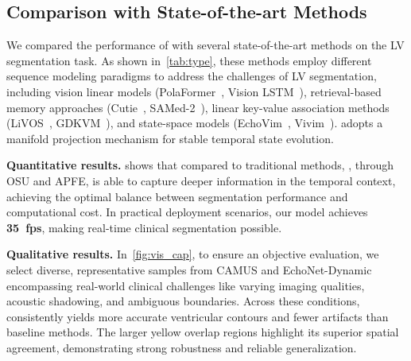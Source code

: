 \subsection{Comparison with State-of-the-art Methods}
    \label{subsec:comparisons}

\noindent
We compared the performance of \mymodel with several state-of-the-art methods on the LV segmentation task.
As shown in~\cref{tab:type}, these methods employ different sequence modeling paradigms to address the challenges of LV segmentation,
including vision linear models (PolaFormer~\cite{PolaFormer}, Vision LSTM~\cite{ICLR2025_3b6eaef6}),
retrieval-based memory approaches (Cutie~\cite{cvpr24_cutie}, SAMed-2~\cite{MICCAI25_SAMed2}),
linear key-value association methods (LiVOS~\cite{Liu_2025_CVPR}, GDKVM~\cite{ICCV25_gdkvm}),
and state-space models (EchoVim~\cite{mm25_echovim}, Vivim~\cite{10973086}).
\mymodel adopts a manifold projection mechanism for stable temporal state evolution.

\noindent
\textbf{Quantitative results.}
 shows that compared to traditional methods, \mymodel, through OSU and APFE, is able to capture deeper information in the temporal context, achieving the optimal balance between segmentation performance and computational cost.
In practical deployment scenarios, our model achieves \textbf{35~fps}, making real-time clinical segmentation possible.

\noindent
\textbf{Qualitative results.}
In~\cref{fig:vis_cap}, to ensure an objective evaluation, we select diverse, representative samples from CAMUS and EchoNet-Dynamic encompassing real-world clinical challenges like varying imaging qualities, acoustic shadowing, and ambiguous boundaries.
Across these conditions, \mymodel consistently yields more accurate ventricular contours and fewer artifacts than baseline methods.
The larger yellow overlap regions highlight its superior spatial agreement, demonstrating strong robustness and reliable generalization.